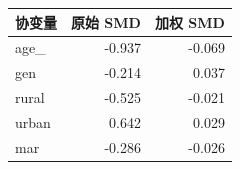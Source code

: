 \begin{tabular}{lrr}
\toprule
协变量 & 原始 SMD & 加权 SMD \\
\midrule
age\_ & -0.937 & -0.069 \\
gen & -0.214 & 0.037 \\
rural & -0.525 & -0.021 \\
urban & 0.642 & 0.029 \\
mar & -0.286 & -0.026 \\
\bottomrule
\end{tabular}
